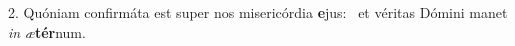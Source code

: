 2. Quóniam confirmáta est super nos misericórdia \textbf{e}jus: \ast\  et véritas Dómini manet \textit{in} \textit{æ}\textbf{tér}num.\

